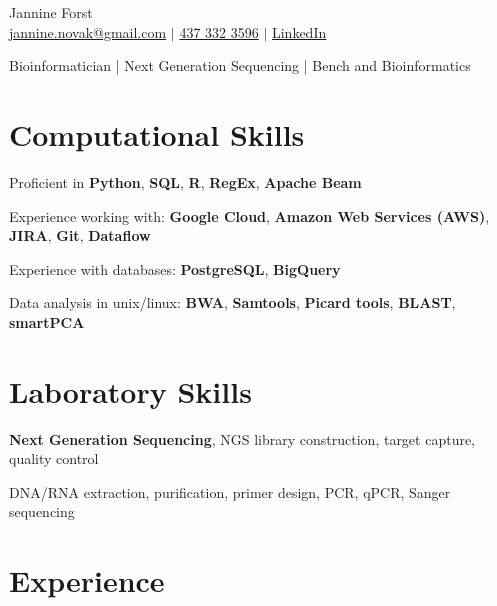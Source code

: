 \documentclass[11pt]{article}
\begin{document}
\begin{center}
    {\fontsize{36}{36}\selectfont\intermedium Jannine Forst} \\ \bigskip
    {\color{icnclr}\faEnvelope[regular]} \href{mailto:jannine.novak@gmail.com}{jannine.novak@gmail.com} $|$ 
    {\color{icnclr}} \href{tel:1234567890}{437 332 3596} $|$
    \href{https://www.linkedin.com/in/jannine-forst/}{\color{icnclr}\faLinkedin} 
    \href{https://www.linkedin.com/in/jannine-forst/} {LinkedIn}
    

    \item{Bioinformatician | Next Generation Sequencing | Bench and Bioinformatics}
\end{center}

\section{Computational Skills}
\begin{description}
    \item Proficient in \textbf{Python}, \textbf{SQL}, \textbf{R}, \textbf{RegEx}, \textbf{Apache Beam}
    \item Experience working with: \textbf{Google Cloud}, \textbf{Amazon Web Services (AWS)}, \textbf{JIRA}, \textbf{Git}, \textbf{Dataflow}
    \item Experience with databases: \textbf{PostgreSQL}, \textbf{BigQuery}
    \item Data analysis in unix/linux: \textbf{BWA}, \textbf{Samtools}, \textbf{Picard tools}, \textbf{BLAST}, \textbf{smartPCA}
\end{description}

\section{Laboratory Skills}
\begin{description}
    \item \textbf{Next Generation Sequencing}, NGS library construction, target capture, quality control
    \item DNA/RNA extraction, purification, primer design, PCR, qPCR, Sanger sequencing
\end{description}


\section{Experience}
\bigskip
\end{document}
